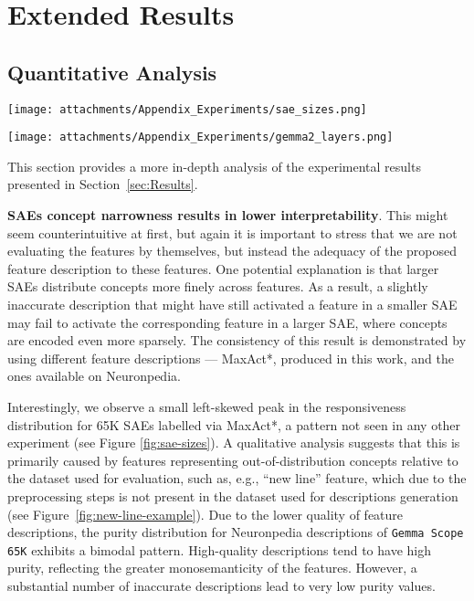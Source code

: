 \section{Extended Results}
\subsection{Quantitative Analysis}
\begin{figure*}[t]
    \centering
    \texttt{[image: attachments/Appendix\_Experiments/sae\_sizes.png]}
    \caption{Feature descriptions fit for SAEs of different sizes.}
    \label{fig:sae-sizes}
\end{figure*}

\begin{figure*}[t]
    \centering
    \texttt{[image: attachments/Appendix\_Experiments/gemma2\_layers.png]}
    \caption{Feature descriptions fit for different layers of Gemma-2. }
    \label{fig:gemma2-layers}
\end{figure*}
\label{appendix-extended-results}


This section provides a more in-depth analysis of the experimental results presented in Section~\ref{sec:Results}.

\textbf{SAEs concept narrowness results in lower interpretability}. 
This might seem counterintuitive at first, but again it is important to stress that we are not evaluating the features by themselves, but instead the adequacy of the proposed feature description to these features. 
One potential explanation is that larger SAEs distribute concepts more finely across features. As a result, a slightly inaccurate description that might have still activated a feature in a smaller SAE may fail to activate the corresponding feature in a larger SAE, where concepts are encoded even more sparsely. The consistency of this result is demonstrated by using different feature descriptions --- MaxAct*, produced in this work, and the ones available on Neuronpedia. 

Interestingly, we observe a small left-skewed peak in the responsiveness distribution for 65K SAEs labelled via MaxAct*, a pattern not seen in any other experiment (see Figure \ref{fig:sae-sizes}). A qualitative analysis suggests that this is primarily caused by features representing out-of-distribution concepts relative to the dataset used for evaluation, such as, e.g., ``new line'' feature, which due to the preprocessing steps is not present in the dataset used for descriptions generation (see Figure~\ref{fig:new-line-example}). Due to the lower quality of feature descriptions, the purity distribution for Neuronpedia descriptions of \texttt{Gemma Scope 65K} exhibits a bimodal pattern. High-quality descriptions tend to have high purity, reflecting the greater monosemanticity of the features. However, a substantial number of inaccurate descriptions lead to very low purity values.


